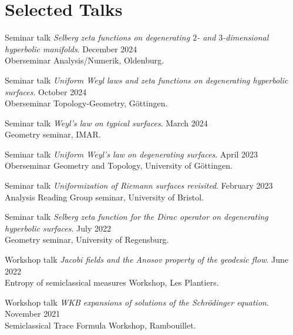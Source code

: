 \documentclass[a4paper, 11pt]{article}
\begin{document}
\section{Selected Talks}
 \begin{itemize}[leftmargin=0.5cm]
 	{\item{
 			Seminar talk \textit{Selberg zeta functions on degenerating $2$- and $3$-dimensional \\ hyperbolic manifolds}.
 			\hfill
 			December 2024\\
 			Oberseminar Analysis/Numerik, Oldenburg.
 	}}
	{\item{
			Seminar talk \textit{Uniform Weyl laws and zeta functions on degenerating hyperbolic surfaces}.
			\hfill
			October 2024\\
			Oberseminar Topology-Geometry, G\" ottingen.
	}}
	{\item{
			Seminar talk \textit{Weyl's law on typical surfaces}.
			\hfill
			March 2024\\
			Geometry seminar, IMAR.
	}}
	{\item{
			Seminar talk \textit{Uniform Weyl's law on degenerating surfaces}.
			\hfill
			April 2023\\
			Oberseminar Geometry and Topology, University of Göttingen.
	}}
	{\item{
			Seminar talk \textit{Uniformization of Riemann surfaces revisited}.
			\hfill
			February 2023\\
			Analysis Reading Group seminar, University of Bristol.
	}}
	{\item{
		Seminar talk \textit{Selberg zeta function for the Dirac operator on degenerating hyperbolic surfaces}.
		\hfill
		July 2022\\
		Geometry seminar, University of Regensburg.
	}}
	{\item{
			Workshop talk \textit{Jacobi fields and the Anosov property of the geodesic flow}.
			\hfill
			June 2022\\
			Entropy of semiclassical measures Workshop, Les Plantiers.
	}}
	{\item{
			Workshop talk \textit{WKB expansions of solutions of the Schrödinger equation}.
			\hfill
			November 2021\\
			Semiclassical Trace Formula Workshop, Rambouillet.
	}}
\end{itemize}
\end{document}
